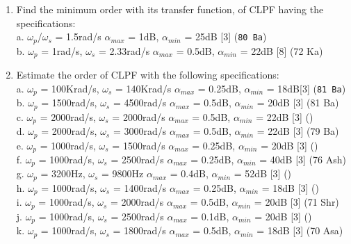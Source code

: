 \documentclass[12pt]{article}
\newcommand{\w}{\(\omega\)}
\begin{document}
\begin{enumerate}
				\item Find the minimum order with its transfer function, of CLPF having the specifications:\\
				a. \w$_p$/\w$_s$ = 1.5rad/s \hspace{5.8cm}
				$\alpha_{max}$ = 1dB, $\alpha_{min}$ = 25dB \hfill [3] (\texttt{80 Ba})\\ 
				b. \w$_p$ = 1rad/s, \w$_s$ = 2.33rad/s \hspace{3.7cm}
				$\alpha_{max}$ = 0.5dB, $\alpha_{min}$ = 22dB \hfill[8] (72 Ka)

				\item Estimate the order of CLPF with the following specifications:\\
				a. \w$_p$ = 100Krad/s, \w$_s$ = 140Krad/s \hspace{2.8cm}
				$\alpha_{max}$ = 0.25dB, $\alpha_{min}$ = 18dB\hfill [3] (\texttt{81 Ba})\\
				b. \w$_p$ = 1500rad/s, \w$_s$ = 4500rad/s \hspace{3cm}
				$\alpha_{max}$ = 0.5dB, $\alpha_{min}$ = 20dB \hfill[3] (81 Ba)\\
				c. \w$_p$ = 2000rad/s, \w$_s$ = 2000rad/s \hspace{30.5mm}
				$\alpha_{max}$ = 0.5dB, $\alpha_{min}$ = 22dB \hfill[3] ()\\
				d. \w$_p$ = 2000rad/s, \w$_s$ = 3000rad/s \hspace{3cm}
				$\alpha_{max}$ = 0.5dB, $\alpha_{min}$ = 22dB \hfill[3] (79 Ba)\\
				e. \w$_p$ = 1000rad/s, \w$_s$ = 1500rad/s \hspace{30.5mm}
				$\alpha_{max}$ = 0.25dB, $\alpha_{min}$ = 20dB \hfill[3] ()\\
				f. \w$_p$ = 1000rad/s, \w$_s$ = 2500rad/s \hspace{3.1cm}
				$\alpha_{max}$ = 0.25dB, $\alpha_{min}$ = 40dB \hfill[3] (76 Ash)\\
				g. \w$_p$ = 3200Hz, \w$_s$ = 9800Hz \hspace{3.95cm}
				$\alpha_{max}$ = 0.4dB, $\alpha_{min}$ = 52dB \hfill[3] ()\\
				h. \w$_p$ = 1000rad/s, \w$_s$ = 1400rad/s \hspace{3cm}
				$\alpha_{max}$ = 0.25dB, $\alpha_{min}$ = 18dB \hfill[3] ()\\
				i. \w$_p$ = 1000rad/s, \w$_s$ = 2000rad/s \hspace{3.1cm}
				$\alpha_{max}$ = 0.5dB, $\alpha_{min}$ = 20dB \hfill[3] (71 Shr)\\
				j. \w$_p$ = 1000rad/s, \w$_s$ = 2500rad/s \hspace{3.1cm}
				$\alpha_{max}$ = 0.1dB, $\alpha_{min}$ = 20dB \hfill[3] ()\\
				k. \w$_p$ = 1000rad/s, \w$_s$ = 1800rad/s \hspace{3cm}
				$\alpha_{max}$ = 0.5dB, $\alpha_{min}$ = 18dB \hfill[3] (70 Asa)


\end{enumerate}
\end{document}
